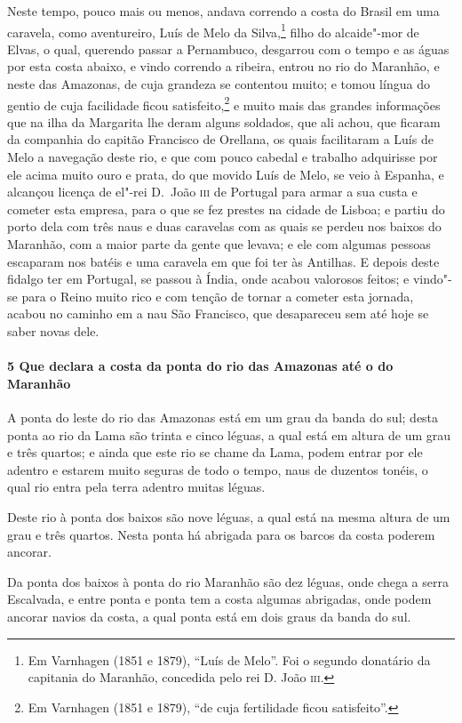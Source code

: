 \begin{linenumbers}
Neste tempo, pouco mais ou menos, andava correndo a costa do Brasil em uma caravela, como
aventureiro, Luís de Melo da Silva,\footnote{ Em Varnhagen (1851 e 1879), ``Luís de Melo''.
Foi o segundo donatário da capitania do Maranhão, concedida pelo rei D. João
\textsc{iii}.} filho do alcaide"-mor de Elvas, o qual, querendo passar a Pernambuco,
desgarrou com o tempo e as águas por esta costa abaixo, e vindo correndo a ribeira, entrou
no rio do Maranhão, e neste das Amazonas, de cuja grandeza se contentou muito; e tomou
língua do gentio de cuja facilidade ficou satisfeito,\footnote{ Em Varnhagen (1851 e
1879), ``de cuja fertilidade ficou satisfeito''.} e muito mais das grandes informações que
na ilha da Margarita lhe deram alguns soldados, que ali achou, que ficaram da companhia do
capitão Francisco de Orellana, os quais facilitaram a Luís de Melo a navegação deste rio,
e que com pouco cabedal e trabalho adquirisse por ele acima muito ouro e prata, do que
movido Luís de Melo, se veio à Espanha, e alcançou licença de el"-rei D.~João \textsc{iii}
de Portugal para armar a sua custa e cometer esta empresa, para o que se fez prestes na
cidade de Lisboa; e partiu do porto dela com três naus e duas caravelas com as quais se
perdeu nos baixos do Maranhão, com a maior parte da gente que levava; e ele com algumas
pessoas escaparam nos batéis e uma caravela em que foi ter às Antilhas. E depois deste
fidalgo ter em Portugal, se passou à Índia, onde acabou valorosos feitos; e vindo"-se para
o Reino muito rico e com tenção de tornar a cometer esta jornada, acabou no caminho em a
nau São Francisco, que desapareceu sem até hoje se saber novas dele.

\paragraph{5 Que declara a costa da ponta do rio das Amazonas até o do Maranhão} \quad
A ponta do leste do rio das Amazonas está em um grau da banda do sul; desta ponta ao rio
da Lama são trinta e cinco léguas, a qual está em altura de um grau e três quartos; e
ainda que este rio se chame da Lama, podem entrar por ele adentro e estarem muito seguras
de todo o tempo, naus de duzentos tonéis, o qual rio entra pela terra adentro muitas
léguas.

Deste rio à ponta dos baixos são nove léguas, a qual está na mesma altura de um grau e
três quartos. Nesta ponta há abrigada para os barcos da costa poderem ancorar.

Da ponta dos baixos à ponta do rio Maranhão são dez léguas, onde chega a serra Escalvada,
e entre ponta e ponta tem a costa algumas abrigadas, onde podem ancorar navios da costa, a
qual ponta está em dois graus da banda do sul.


\end{linenumbers}
